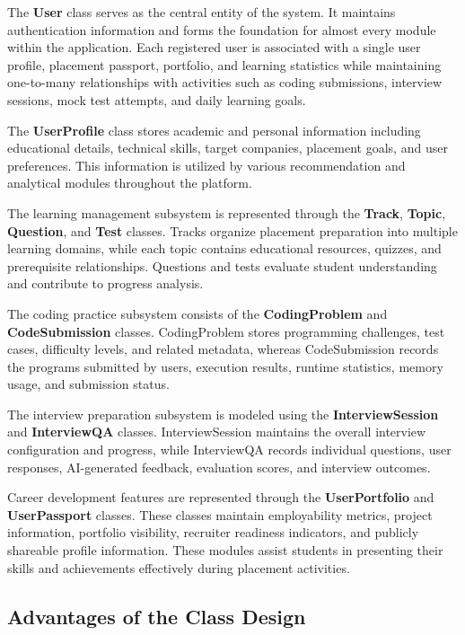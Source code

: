 The \textbf{User} class serves as the central entity of the system. It maintains authentication information and forms the foundation for almost every module within the application. Each registered user is associated with a single user profile, placement passport, portfolio, and learning statistics while maintaining one-to-many relationships with activities such as coding submissions, interview sessions, mock test attempts, and daily learning goals.

The \textbf{UserProfile} class stores academic and personal information including educational details, technical skills, target companies, placement goals, and user preferences. This information is utilized by various recommendation and analytical modules throughout the platform.

The learning management subsystem is represented through the \textbf{Track}, \textbf{Topic}, \textbf{Question}, and \textbf{Test} classes. Tracks organize placement preparation into multiple learning domains, while each topic contains educational resources, quizzes, and prerequisite relationships. Questions and tests evaluate student understanding and contribute to progress analysis.

The coding practice subsystem consists of the \textbf{CodingProblem} and \textbf{CodeSubmission} classes. CodingProblem stores programming challenges, test cases, difficulty levels, and related metadata, whereas CodeSubmission records the programs submitted by users, execution results, runtime statistics, memory usage, and submission status.

The interview preparation subsystem is modeled using the \textbf{InterviewSession} and \textbf{InterviewQA} classes. InterviewSession maintains the overall interview configuration and progress, while InterviewQA records individual questions, user responses, AI-generated feedback, evaluation scores, and interview outcomes.

Career development features are represented through the \textbf{UserPortfolio} and \textbf{UserPassport} classes. These classes maintain employability metrics, project information, portfolio visibility, recruiter readiness indicators, and publicly shareable profile information. These modules assist students in presenting their skills and achievements effectively during placement activities.

\subsection{Advantages of the Class Design}

